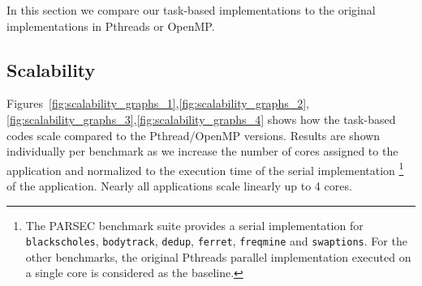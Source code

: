 
In this section we compare our task-based implementations to the original \PARSEC{} implementations in Pthreads or OpenMP.

\subsection{Scalability}
\label{subsec:scalability}
Figures~\ref{fig:scalability_graphs_1},\ref{fig:scalability_graphs_2},\ref{fig:scalability_graphs_3},\ref{fig:scalability_graphs_4} 
shows how the task-based codes scale compared to the \PARSEC{} Pthread/OpenMP versions. 
Results are shown individually per benchmark as we increase the number 
of cores assigned to the application and normalized to the execution time of the serial implementation
\footnote{The PARSEC benchmark suite provides a serial implementation for \texttt{blackscholes}, \texttt{bodytrack}, \texttt{dedup}, \texttt{ferret}, 
\texttt{freqmine} and \texttt{swaptions}. 
For the other benchmarks, the original Pthreads parallel implementation executed on a single core is considered as the baseline.}
 of the application. Nearly all applications scale linearly up to 4 cores.

